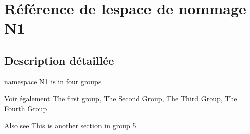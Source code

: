 \hypertarget{namespace_n1}{}\section{Référence de l\textquotesingle{}espace de nommage N1}
\label{namespace_n1}


\subsection{Description détaillée}
namespace \hyperlink{namespace_n1}{N1} is in four groups \begin{DoxySeeAlso}{Voir également}
\hyperlink{group__group1}{The first group}, \hyperlink{group__group2}{The Second Group}, \hyperlink{group__group3}{The Third Group}, \hyperlink{group__group4}{The Fourth Group}
\end{DoxySeeAlso}
Also see \hyperlink{group__group5}{This is another section in group 5} 